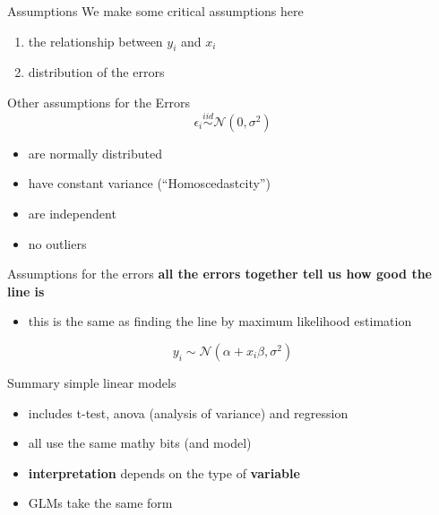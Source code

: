 \documentclass[
  ignorenonframetext,
]{beamer}
\providecommand{\tightlist}{%
  \setlength{\itemsep}{0pt}\setlength{\parskip}{0pt}}
\begin{document}
\begin{frame}{Assumptions}
\label{assumptions}
We make some critical assumptions here

\begin{enumerate}
[1)]
\tightlist
\item
  the relationship between \(y_i\) and \(x_i\)
\item
  distribution of the errors
\end{enumerate}
\end{frame}

\begin{frame}{Other assumptions for the Errors}
\label{other-assumptions-for-the-errors}
\begin{equation}
\epsilon_i \overset{iid}{\sim} \mathcal{N}(0, \sigma^2)
\end{equation}

\begin{itemize}
\tightlist
\item
  are normally distributed
\item
  have constant variance (``Homoscedastcity'')
\item
  are independent
\item
  no outliers
\end{itemize}
\end{frame}

\begin{frame}{Assumptions for the errors}
\label{assumptions-for-the-errors}
\textbf{all the errors together tell us how good the line is}

\begin{itemize}
\tightlist
\item
  this is the same as finding the line by maximum likelihood estimation
\end{itemize}

\begin{equation}
y_i \sim \mathcal{N}(\alpha+x_i\beta, \sigma^2)
\end{equation}
\end{frame}

\begin{frame}{Summary simple linear models}
\label{summary-simple-linear-models}
\begin{itemize}
\tightlist
\item
  includes t-test, anova (analysis of variance) and regression
\item
  all use the same mathy bits (and model)
\item
  \textbf{interpretation} depends on the type of \textbf{variable}
\item
  GLMs take the same form
\end{itemize}
\end{frame}
\end{document}
